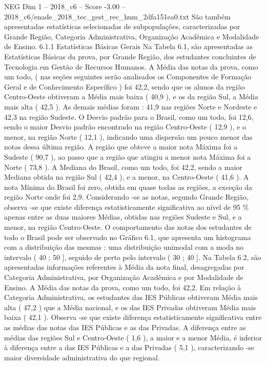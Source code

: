 \begin{textsample}{NEG Dim 1 – 2018\_c6 – Score -3.00 – 2018\_c6/enade\_2018\_tec\_gest\_rec\_hum\_2dfa151ea0.txt}
São também apresentadas estatísticas selecionadas de subpopulações, caracterizadas por Grande Região, Categoria Administrativa, Organização Acadêmica e Modalidade de Ensino. 6.1.1 Estatísticas Básicas Gerais Na Tabela 6.1, são apresentadas as Estatísticas Básicas da prova, por Grande Região, dos estudantes concluintes de Tecnologia em Gestão de Recursos Humanos.
A Média das notas da prova, como um todo, ( nas seções seguintes serão analisados os Componentes de Formação Geral e de Conhecimento Específico ) foi 42,2, sendo que os alunos da região Centro-Oeste obtiveram a Média mais baixa ( 40,9 ), e os da região Sul, a Média mais alta ( 42,5 ).
As demais médias foram : 41,9 nas regiões Norte e Nordeste e 42,3 na região Sudeste.
O Desvio padrão para o Brasil, como um todo, foi 12,6, sendo o maior Desvio padrão encontrado na região Centro-Oeste ( 12,9 ), e o menor, na região Norte ( 12,1 ), indicando uma dispersão um pouco menor das notas dessa última região.
A região que obteve a maior nota Máxima foi a Sudeste ( 90,7 ), ao passo que a região que atingiu a menor nota Máxima foi a Norte ( 73,8 ).
A Mediana do Brasil, como um todo, foi 42,2, sendo a maior Mediana obtida na região Sul ( 42,4 ), e a menor, na Centro-Oeste ( 41,6 ).
A nota Mínima do Brasil foi zero, obtida em quase todas as regiões, a exceção da região Norte onde foi 2,9.
Considerando -se as notas, segundo Grande Região, observa -se que existe diferença estatisticamente significativa ao nível de 95 \% apenas entre as duas maiores Médias, obtidas nas regiões Sudeste e Sul, e a menor, na região Centro-Oeste.
O comportamento das notas dos estudantes de todo o Brasil pode ser observado no Gráfico 6.1, que apresenta um histograma com a distribuição das mesmas : uma distribuição unimodal com a moda no intervalo ( 40 ; 50 ], seguido de perto pelo intervalo ( 30 ; 40 ].
Na Tabela 6.2, são apresentadas informações referentes à Média da nota final, desagregadas por Categoria Administrativa, por Organização Acadêmica e por Modalidade de Ensino.
A Média das notas da prova, como um todo, foi 42,2.
Em relação à Categoria Administrativa, os estudantes das IES Públicas obtiveram Média mais alta ( 47,2 ) que a Média nacional, e os das IES Privadas obtiveram Média mais baixa ( 42,1 ).
Observa -se que existe diferença estatisticamente significativa entre as médias das notas das IES Públicas e as das Privadas.
A diferença entre as médias das regiões Sul e Centro-Oeste ( 1,6 ), a maior e a menor Média, é inferior à diferença entre a das IES Públicas e a das Privadas ( 5,1 ), caracterizando -se maior diversidade administrativa do que regional.

\end{textsample}
